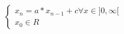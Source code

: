 \documentclass[10pt,a4paper]{article}
\begin{document}
$$
\left\{
    \begin{array}{ll}
        x_{n} = a*x_{n-1} + c   \forall x \in ]0,\infty[ \\
        x_{0} \in R
    \end{array}
\right.
$$
\end{document}
